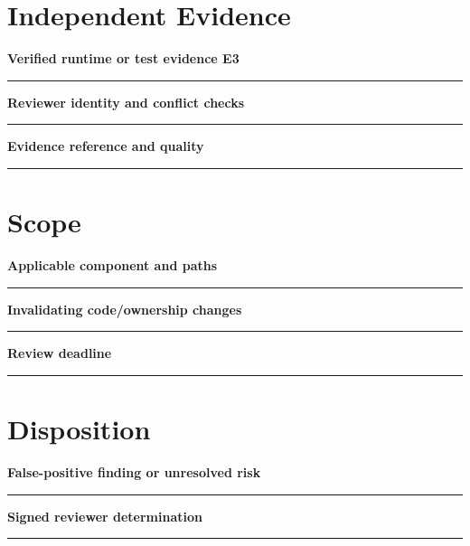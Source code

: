\documentclass[11pt,letterpaper]{article}
\begin{document}
\section{Independent Evidence}
\noindent\textbf{Verified runtime or test evidence E3}\par
\vspace{1.1em}\noindent\rule{0.96\linewidth}{0.4pt}\par\vspace{0.65em}
\noindent\textbf{Reviewer identity and conflict checks}\par
\vspace{1.1em}\noindent\rule{0.96\linewidth}{0.4pt}\par\vspace{0.65em}
\noindent\textbf{Evidence reference and quality}\par
\vspace{1.1em}\noindent\rule{0.96\linewidth}{0.4pt}\par\vspace{0.65em}
\section{Scope}
\noindent\textbf{Applicable component and paths}\par
\vspace{1.1em}\noindent\rule{0.96\linewidth}{0.4pt}\par\vspace{0.65em}
\noindent\textbf{Invalidating code/ownership changes}\par
\vspace{1.1em}\noindent\rule{0.96\linewidth}{0.4pt}\par\vspace{0.65em}
\noindent\textbf{Review deadline}\par
\vspace{1.1em}\noindent\rule{0.96\linewidth}{0.4pt}\par\vspace{0.65em}
\section{Disposition}
\noindent\textbf{False-positive finding or unresolved risk}\par
\vspace{1.1em}\noindent\rule{0.96\linewidth}{0.4pt}\par\vspace{0.65em}
\noindent\textbf{Signed reviewer determination}\par
\vspace{1.1em}\noindent\rule{0.96\linewidth}{0.4pt}\par\vspace{0.65em}
\end{document}
